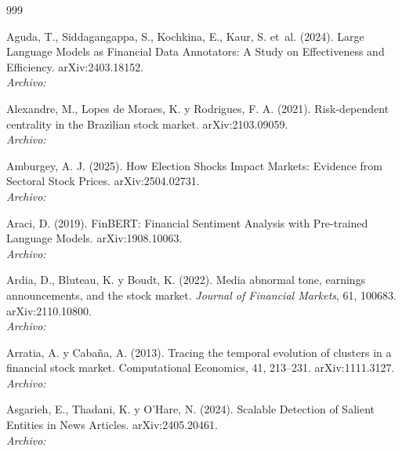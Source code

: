 \begin{thebibliography}{999}

Aguda, T., Siddagangappa, S., Kochkina, E., Kaur, S. et~al. (2024). Large Language Models as Financial Data Annotators: A Study on Effectiveness and Efficiency. arXiv:2403.18152.
\\\textit{Archivo:} 

Alexandre, M., Lopes de Moraes, K. y Rodrigues, F. A. (2021). Risk-dependent centrality in the Brazilian stock market. arXiv:2103.09059.
\\\textit{Archivo:} 

Amburgey, A. J. (2025). How Election Shocks Impact Markets: Evidence from Sectoral Stock Prices. arXiv:2504.02731.
\\\textit{Archivo:} 

Araci, D. (2019). {FinBERT}: Financial Sentiment Analysis with Pre-trained Language Models. arXiv:1908.10063.
\\\textit{Archivo:} 

Ardia, D., Bluteau, K. y Boudt, K. (2022). Media abnormal tone, earnings announcements, and the stock market. \emph{Journal of Financial Markets}, 61, 100683. arXiv:2110.10800.
\\\textit{Archivo:} 

Arratia, A. y Cabaña, A. (2013). Tracing the temporal evolution of clusters in a financial stock market. Computational Economics, 41, 213–231. arXiv:1111.3127.
\\\textit{Archivo:} 

Asgarieh, E., Thadani, K. y O'Hare, N. (2024). Scalable Detection of Salient Entities in News Articles. arXiv:2405.20461.
\\\textit{Archivo:} 


\end{thebibliography}
